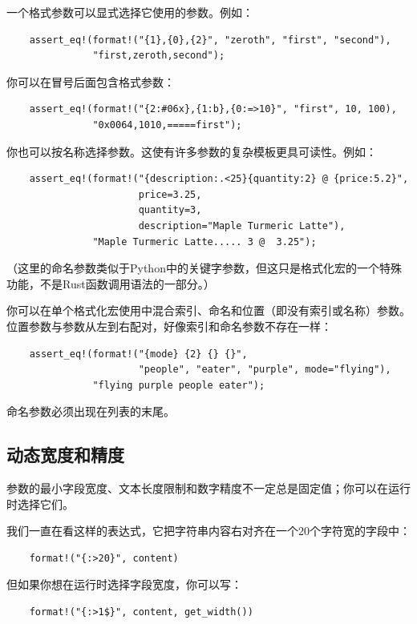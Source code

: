 一个格式参数可以显式选择它使用的参数。例如：
\begin{verbatim}
    assert_eq!(format!("{1},{0},{2}", "zeroth", "first", "second"),
               "first,zeroth,second");
\end{verbatim}

你可以在冒号后面包含格式参数：
\begin{verbatim}
    assert_eq!(format!("{2:#06x},{1:b},{0:=>10}", "first", 10, 100),
               "0x0064,1010,=====first");
\end{verbatim}

你也可以按名称选择参数。这使有许多参数的复杂模板更具可读性。例如：
\begin{verbatim}
    assert_eq!(format!("{description:.<25}{quantity:2} @ {price:5.2}",
                       price=3.25,
                       quantity=3,
                       description="Maple Turmeric Latte"),
               "Maple Turmeric Latte..... 3 @  3.25");
\end{verbatim}

（这里的命名参数类似于Python中的关键字参数，但这只是格式化宏的一个特殊功能，不是Rust函数调用语法的一部分。）

你可以在单个格式化宏使用中混合索引、命名和位置（即没有索引或名称）参数。位置参数与参数从左到右配对，好像索引和命名参数不存在一样：
\begin{verbatim}
    assert_eq!(format!("{mode} {2} {} {}",
                       "people", "eater", "purple", mode="flying"),
               "flying purple people eater");
\end{verbatim}

命名参数必须出现在列表的末尾。

\subsection{动态宽度和精度}

参数的最小字段宽度、文本长度限制和数字精度不一定总是固定值；你可以在运行时选择它们。

我们一直在看这样的表达式，它把字符串内容右对齐在一个20个字符宽的字段中：
\begin{verbatim}
    format!("{:>20}", content)
\end{verbatim}

但如果你想在运行时选择字段宽度，你可以写：
\begin{verbatim}
    format!("{:>1$}", content, get_width())
\end{verbatim}

